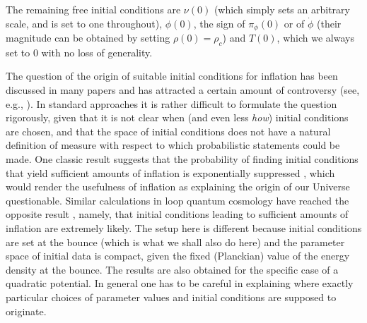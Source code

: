 \documentclass[aps,prd,11pt,showkeys,nofootinbib]{revtex4-2}
\begin{document}
The remaining free initial conditions are $\nu(0)$ (which simply sets an arbitrary scale, and is set to one throughout), $\phi(0)$, the sign of $\pi_\phi(0)$ or of $\dot\phi$ (their magnitude can be obtained by setting $\rho(0)=\rho_c$) and $T(0)$, which we always set to $0$ with no loss of generality. 

The question of the origin of suitable initial conditions for inflation has been discussed in many papers and has attracted a certain amount of controversy (see, e.g., \cite{Ijjas:2013vea}). In standard approaches it is rather difficult to formulate the question rigorously, given that it is not clear when (and even less {\em how}) initial conditions are chosen, and that the space of initial conditions does not have a natural definition of measure with respect to which probabilistic statements could be made. One classic result suggests that the probability of finding initial conditions that yield sufficient amounts of inflation is exponentially suppressed \cite{Gibbons:2006pa}, which would render the usefulness of inflation as explaining the origin of our Universe questionable. Similar calculations in loop quantum cosmology have reached the opposite result \cite{Ashtekar:2009mm,Ashtekar:2011rm}, namely, that initial conditions leading to sufficient amounts of inflation are extremely likely. The setup here is different because initial conditions are set at the bounce (which is what we shall also do here) and the parameter space of initial data is compact, given the fixed (Planckian) value of the energy density at the bounce. The results are also obtained for the specific case of a quadratic potential. In general one has to be careful in explaining where exactly particular choices of parameter values and initial conditions are supposed to originate.
\end{document}
